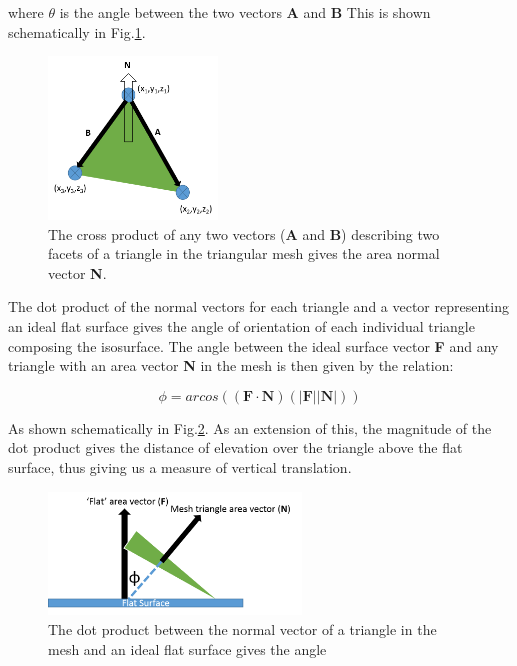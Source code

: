 where $\theta$ is the angle between the two vectors \textbf{A} and \textbf{B}
This is shown schematically in Fig.\ref{crossprod}.

\begin{figure}[h]
	\centering
	\includegraphics[width=0.4\textwidth]{Figs/Ch4/crossprod.png}
	\caption {The cross product of any two vectors (\textbf{A} and \textbf{B}) describing two facets of a triangle in the triangular mesh gives the area normal vector \textbf{N}.}
	\label{crossprod}
\end{figure}
\FloatBarrier

The dot product of the normal vectors for each triangle and a vector representing an ideal flat surface gives the angle of orientation of each individual triangle composing the isosurface. The angle between the ideal surface vector \textbf{F} and any triangle with an area vector \textbf{N} in the mesh is then given by the relation:

\begin{equation}
\phi = arcos((\textbf{F}\cdot\textbf{N})(|\textbf{F}||\textbf{N}|))
\end{equation}

As shown schematically in Fig.\ref{dotprod}. As an extension of this, the magnitude of the dot product gives the distance of elevation over the triangle above the flat surface, thus giving us a measure of vertical translation.

\begin{figure}[h]
	\centering
	\includegraphics[width=0.6\textwidth]{Figs/Ch4/roughnessangle.png}
	\caption {The dot product between the normal vector of a triangle in the mesh and an ideal flat surface gives the angle}
	\label{dotprod}
\end{figure}
\FloatBarrier


